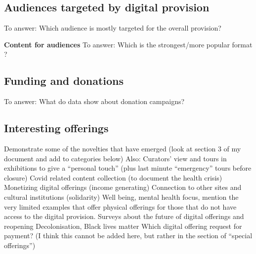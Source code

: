 \documentclass{egpubl}
\begin{document}
\subsection{Audiences targeted by digital provision}
\label{targ}
\color{red}To answer: Which audience is mostly targeted for the overall provision?\color{black}




\noindent \textbf{Content for audiences}
\color{red}To answer: Which is the strongest/more popular format ?\color{black}




\subsection{Funding and donations}
\label{don}
\color{red}To answer: What do data show about donation campaigns?\color{black}



\subsection{Interesting offerings}
\label{int}
Demonstrate some of the novelties that have emerged (look at section 3 of my document and add to categories below)
Also: 
Curators’ view and tours in exhibitions to give a “personal touch” (plus last minute “emergency” tours before closure)
Covid related content collection (to document the health crisis)
Monetizing digital offerings (income generating)
Connection to other sites and cultural institutions (solidarity)
Well being, mental health focus, mention the very limited examples that offer physical offerings for those  that do not have access to the digital provision.
Surveys about the future of digital offerings and reopening
Decolonisation, Black lives matter
Which digital offering request for payment? (I think this cannot be added here, but rather in the section of “special offerings”)
\end{document}
